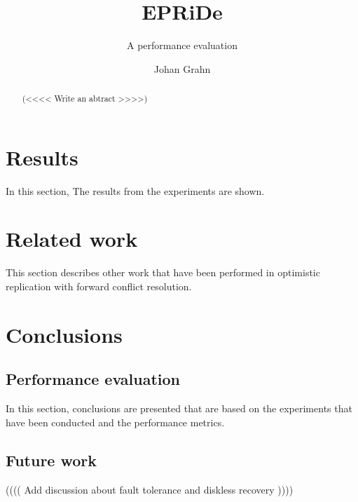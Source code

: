 \documentclass[MSc, ida]{histhesis}
\title{EPRiDe}
\subtitle{A performance evaluation}
\author{Johan Grahn}
\begin{document}
\maketitle
\begin{abstract}

(<<<< Write an abtract >>>>)

\end{abstract}
\tableofcontents
\thispagestyle{plain}
\listoffigures
\newpage

\newpage

\newpage

\newpage

\newpage

\newpage


\newpage

\section{Results} %
\label{sec:results}

In this section, The results from the experiments are shown.


\section{Related work} %
\label{sec:future_work}

This section describes other work that have been performed in optimistic replication with forward conflict resolution.

\section{Conclusions} %
\label{sec:conclusion}


\subsection{Performance evaluation} %
\label{sub:performance_evaluation}

In this section, conclusions are presented that are based on the experiments that have been conducted and the performance metrics.

\subsection{Future work} %
\label{sub:future_work}

(((( Add discussion about fault tolerance and diskless recovery ))))

\newpage



\end{document}
